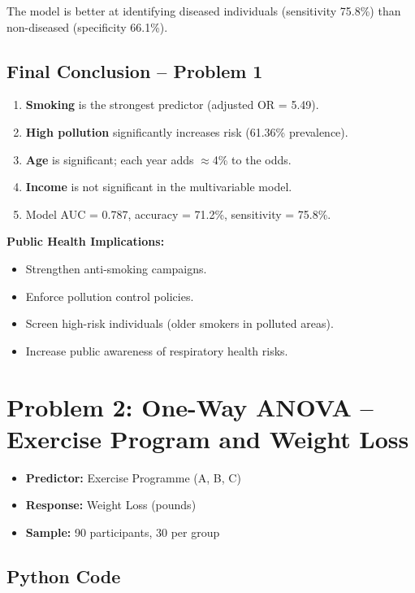 \documentclass[12pt,a4paper]{article}
\begin{document}
The model is better at identifying diseased individuals (sensitivity 75.8\%) than non-diseased (specificity 66.1\%).

\subsection{Final Conclusion -- Problem 1}

\begin{enumerate}[leftmargin=*]
  \item \textbf{Smoking} is the strongest predictor (adjusted OR = 5.49).
  \item \textbf{High pollution} significantly increases risk (61.36\% prevalence).
  \item \textbf{Age} is significant; each year adds $\approx$4\% to the odds.
  \item \textbf{Income} is not significant in the multivariable model.
  \item Model AUC = 0.787, accuracy = 71.2\%, sensitivity = 75.8\%.
\end{enumerate}

\noindent\textbf{Public Health Implications:}
\begin{itemize}[leftmargin=*]
  \item Strengthen anti-smoking campaigns.
  \item Enforce pollution control policies.
  \item Screen high-risk individuals (older smokers in polluted areas).
  \item Increase public awareness of respiratory health risks.
\end{itemize}

\section{Problem 2: One-Way ANOVA -- Exercise Program and Weight Loss}

\begin{itemize}[leftmargin=*]
  \item \textbf{Predictor:} Exercise Programme (A, B, C)
  \item \textbf{Response:} Weight Loss (pounds)
  \item \textbf{Sample:} 90 participants, 30 per group
\end{itemize}

\subsection{Python Code}
\end{document}
